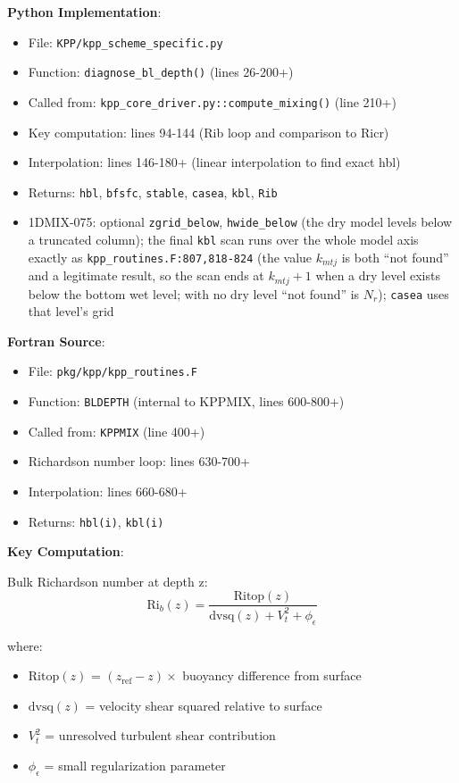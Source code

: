 \documentclass[11pt]{article}
\begin{document}
\textbf{Python Implementation}:
\begin{itemize}
    \item File: \verb|KPP/kpp_scheme_specific.py|
    \item Function: \verb|diagnose_bl_depth()| (lines 26-200+)
    \item Called from: \verb|kpp_core_driver.py::compute_mixing()| (line 210+)
    \item Key computation: lines 94-144 (Rib loop and comparison to Ricr)
    \item Interpolation: lines 146-180+ (linear interpolation to find exact hbl)
    \item Returns: \verb|hbl|, \verb|bfsfc|, \verb|stable|, \verb|casea|, \verb|kbl|, \verb|Rib|
    \item 1DMIX-075: optional \verb|zgrid_below|, \verb|hwide_below| (the dry model levels below a truncated column); the final \verb|kbl| scan runs over the whole model axis exactly as \verb|kpp_routines.F:807,818-824| (the value $k_{mtj}$ is both ``not found'' and a legitimate result, so the scan ends at $k_{mtj}+1$ when a dry level exists below the bottom wet level; with no dry level ``not found'' is $N_r$); \verb|casea| uses that level's grid
\end{itemize}

\textbf{Fortran Source}:
\begin{itemize}
    \item File: \verb|pkg/kpp/kpp_routines.F|
    \item Function: \verb|BLDEPTH| (internal to KPPMIX, lines 600-800+)
    \item Called from: \verb|KPPMIX| (line 400+)
    \item Richardson number loop: lines 630-700+
    \item Interpolation: lines 660-680+
    \item Returns: \verb|hbl(i)|, \verb|kbl(i)|
\end{itemize}

\textbf{Key Computation}:

Bulk Richardson number at depth z:
\begin{equation}
\text{Ri}_b(z) = \frac{\text{Ritop}(z)}{\text{dvsq}(z) + V_t^2 + \phi_\epsilon}
\end{equation}

where:
\begin{itemize}
    \item $\text{Ritop}(z)$ = $(z_{\text{ref}} - z) \times$ buoyancy difference from surface
    \item $\text{dvsq}(z)$ = velocity shear squared relative to surface
    \item $V_t^2$ = unresolved turbulent shear contribution
    \item $\phi_\epsilon$ = small regularization parameter
\end{itemize}
\end{document}
